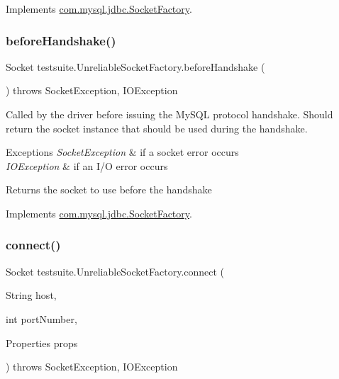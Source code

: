 Implements \mbox{\hyperlink{interfacecom_1_1mysql_1_1jdbc_1_1_socket_factory_adc5277dd008da61b24261a983202f5bf}{com.\+mysql.\+jdbc.\+Socket\+Factory}}.

\mbox{\label{classtestsuite_1_1_unreliable_socket_factory_ad65b14e35905d6b36bf1e93c5b0c90e2}} 
\subsubsection{\texorpdfstring{before\+Handshake()}{beforeHandshake()}}
{\footnotesize\ttfamily Socket testsuite.\+Unreliable\+Socket\+Factory.\+before\+Handshake (\begin{DoxyParamCaption}{ }\end{DoxyParamCaption}) throws Socket\+Exception, I\+O\+Exception}

Called by the driver before issuing the My\+S\+QL protocol handshake. Should return the socket instance that should be used during the handshake.


\begin{DoxyExceptions}{Exceptions}
{\em Socket\+Exception} & if a socket error occurs \\
\hline
{\em I\+O\+Exception} & if an I/O error occurs\\
\hline
\end{DoxyExceptions}
\begin{DoxyReturn}{Returns}
the socket to use before the handshake 
\end{DoxyReturn}


Implements \mbox{\hyperlink{interfacecom_1_1mysql_1_1jdbc_1_1_socket_factory_aa9a78553a76681f49c734aaa3f8f126b}{com.\+mysql.\+jdbc.\+Socket\+Factory}}.

\mbox{\label{classtestsuite_1_1_unreliable_socket_factory_aa23b6bb1ed436f99adc8e51f6b86d641}} 
\subsubsection{\texorpdfstring{connect()}{connect()}}
{\footnotesize\ttfamily Socket testsuite.\+Unreliable\+Socket\+Factory.\+connect (\begin{DoxyParamCaption}\item[{String}]{host,  }\item[{int}]{port\+Number,  }\item[{Properties}]{props }\end{DoxyParamCaption}) throws Socket\+Exception, I\+O\+Exception}

